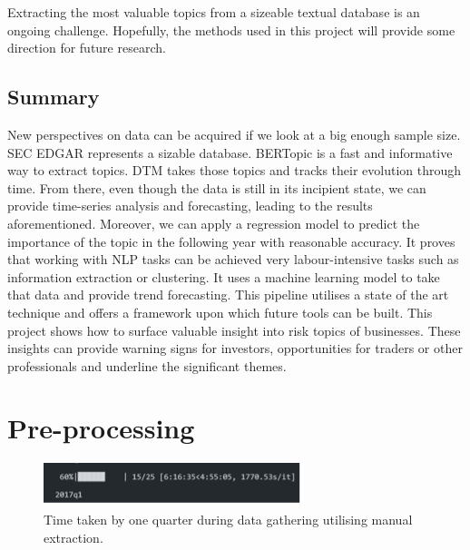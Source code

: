 \documentclass[12pt,MSc,a4paper,oneside]{muthesis}
\begin{document}
Extracting the most valuable topics from a sizeable textual database is an ongoing challenge. Hopefully, the methods used in this project will provide some direction for future research.

\section{Summary}
New perspectives on data can be acquired if we look at a big enough sample size. SEC EDGAR represents a sizable database. BERTopic is a fast and informative way to extract topics. DTM takes those topics and tracks their evolution through time. From there, even though the
data is still in its incipient state, we can provide time-series analysis and forecasting, leading to the results aforementioned. Moreover, we can apply a regression model to predict the importance of the topic in the following year with reasonable accuracy. It proves that working
with NLP tasks can be achieved very labour-intensive tasks such as information extraction or clustering. It uses a machine learning model to take that data and provide trend forecasting. This pipeline utilises a state of the art technique and offers a framework upon which future tools can be built. This project shows how to surface valuable insight into risk topics of businesses. These insights can provide warning signs for investors, opportunities for traders or other professionals and underline the significant themes.



\providecommand{\harvardpreambledefs}[1]{#1}
\providecommand{\harvardpreambletext}[1]{}
\cleardoublepage
{}


\appendix
\chapter{Pre-processing}
\label{appendix:1}
\begin{figure}[h]
    \centering
    \includegraphics[scale=3]{images/appendix/Time taken by one quarter.png}
    \caption{Time taken by one quarter during data gathering utilising manual extraction.}
\end{figure}
\end{document}

